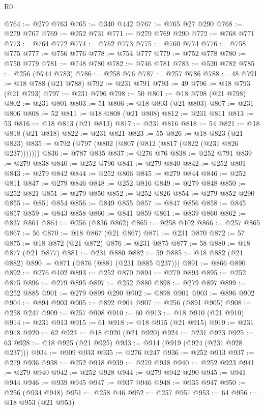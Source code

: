 \begin{lexlean}{R0}
\begin{coremodule}
@764 := @279 @763
@765 := @340 @442
@767 := @765 @27 @290
@768 := @279 @767
@769 := @252 @731
@771 := @279 @769 @290
@772 := @768 @771
@773 := @764 @772
@774 := @762 @773
@775 := @760 @774
@776 := @758 @775
@777 := @756 @776
@778 := @754 @777
@779 := @752 @778
@780 := @750 @779
@781 := @748 @780
@782 := @746 @781
@783 := @520 @782
@785 := @256 (@744 @783)
@786 := @258 @76
@787 := @257 @786
@788 := 48
@791 := @18 @788 (@21 @788)
@792 := @231 @791
@793 := 49
@796 := @18 @793 (@21 @793)
@797 := @231 @796
@798 := 50
@801 := @18 @798 (@21 @798)
@802 := @231 @801
@803 := 51
@806 := @18 @803 (@21 @803)
@807 := @231 @806
@808 := 52
@811 := @18 @808 (@21 @808)
@812 := @231 @811
@813 := 53
@816 := @18 @813 (@21 @813)
@817 := @231 @816
@818 := 54
@821 := @18 @818 (@21 @818)
@822 := @231 @821
@823 := 55
@826 := @18 @823 (@21 @823)
@835 := @792 (@797 (@802 (@807 (@812 (@817 (@822 (@231 @826 @237)))))))
@836 := @787 @835
@837 := @276 @76
@838 := @252 @791
@839 := @279 @838
@840 := @252 @796
@841 := @279 @840
@842 := @252 @801
@843 := @279 @842
@844 := @252 @806
@845 := @279 @844
@846 := @252 @811
@847 := @279 @846
@848 := @252 @816
@849 := @279 @848
@850 := @252 @821
@851 := @279 @850
@852 := @252 @826
@854 := @279 @852 @290
@855 := @851 @854
@856 := @849 @855
@857 := @847 @856
@858 := @845 @857
@859 := @843 @858
@860 := @841 @859
@861 := @839 @860
@862 := @837 @861
@864 := @256 (@836 @862)
@865 := @258 @102
@866 := @257 @865
@867 := 56
@870 := @18 @867 (@21 @867)
@871 := @231 @870
@872 := 57
@875 := @18 @872 (@21 @872)
@876 := @231 @875
@877 := 58
@880 := @18 @877 (@21 @877)
@881 := @231 @880
@882 := 59
@885 := @18 @882 (@21 @882)
@890 := @871 (@876 (@881 (@231 @885 @237)))
@891 := @866 @890
@892 := @276 @102
@893 := @252 @870
@894 := @279 @893
@895 := @252 @875
@896 := @279 @895
@897 := @252 @880
@898 := @279 @897
@899 := @252 @885
@901 := @279 @899 @290
@902 := @898 @901
@903 := @896 @902
@904 := @894 @903
@905 := @892 @904
@907 := @256 (@891 @905)
@908 := @258 @247
@909 := @257 @908
@910 := 60
@913 := @18 @910 (@21 @910)
@914 := @231 @913
@915 := 61
@918 := @18 @915 (@21 @915)
@919 := @231 @918
@920 := 62
@923 := @18 @920 (@21 @920)
@924 := @231 @923
@925 := 63
@928 := @18 @925 (@21 @925)
@933 := @914 (@919 (@924 (@231 @928 @237)))
@934 := @909 @933
@935 := @276 @247
@936 := @252 @913
@937 := @279 @936
@938 := @252 @918
@939 := @279 @938
@940 := @252 @923
@941 := @279 @940
@942 := @252 @928
@944 := @279 @942 @290
@945 := @941 @944
@946 := @939 @945
@947 := @937 @946
@948 := @935 @947
@950 := @256 (@934 @948)
@951 := @258 @46
@952 := @257 @951
@953 := 64
@956 := @18 @953 (@21 @953)

\end{coremodule}
\end{lexlean}
